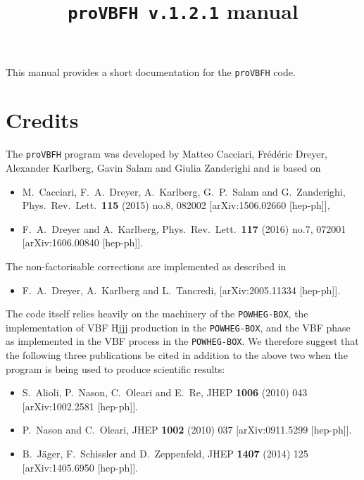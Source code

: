\documentclass[12pt,a4]{article}
\title{\texttt{proVBFH v.1.2.1} manual}
\newcommand{\provbfh}{\texttt{proVBFH}\xspace}
\begin{document}
\maketitle

This manual provides a short documentation for the \provbfh code.

\tableofcontents

\section{Credits}
The \provbfh program was developed by Matteo Cacciari, Fr\'ed\'eric
Dreyer, Alexander Karlberg, Gavin Salam and Giulia Zanderighi and is
based on
\begin{itemize}
  \item M.~Cacciari, F.~A.~Dreyer, A.~Karlberg, G.~P.~Salam and G.~Zanderighi,
  Phys.\ Rev.\ Lett.\  {\bf 115} (2015) no.8,  082002
  [arXiv:1506.02660 [hep-ph]],
\item F.~A.~Dreyer and A.~Karlberg,
  Phys.\ Rev.\ Lett.\  {\bf 117} (2016) no.7,  072001
  [arXiv:1606.00840 [hep-ph]].
\end{itemize}
%
The non-factorisable corrections are implemented as described in
\begin{itemize}
\item F.~A.~Dreyer, A.~Karlberg and L.~Tancredi,
  [arXiv:2005.11334 [hep-ph]].
\end{itemize}
%
The code itself relies heavily on the machinery of the
\texttt{POWHEG-BOX}, the implementation of VBF Hjjj production in the
\texttt{POWHEG-BOX}, and the VBF phase as implemented in the VBF
process in the \texttt{POWHEG-BOX}.
%
We therefore suggest that the following three publications be cited in
addition to the above two when the program is being used to produce
scientific results:

\begin{itemize}
\item S.~Alioli, P.~Nason, C.~Oleari and E.~Re,
  JHEP {\bf 1006} (2010) 043
  [arXiv:1002.2581 [hep-ph]].
\item P.~Nason and C.~Oleari,
  JHEP {\bf 1002} (2010) 037
  [arXiv:0911.5299 [hep-ph]].
\item B.~J\"ager, F.~Schissler and D.~Zeppenfeld,
  JHEP {\bf 1407} (2014) 125
  [arXiv:1405.6950 [hep-ph]].
\end{itemize}
\end{document}
